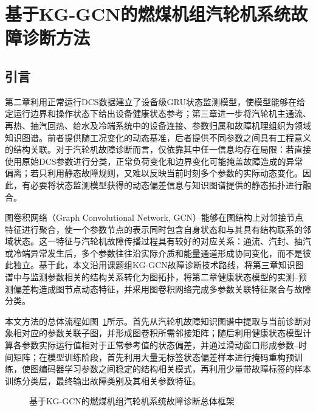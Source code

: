 \section{基于KG-GCN的燃煤机组汽轮机系统故障诊断方法}
\label{sec:kg_gcn_v2}

\subsection{引言}

第二章利用正常运行DCS数据建立了设备级GRU状态监测模型，使模型能够在给定运行边界和操作状态下给出设备健康状态参考；第三章进一步将汽轮机主通流、再热、抽汽回热、给水及冷端系统中的设备连接、参数归属和故障机理组织为领域知识图谱。前者提供随工况变化的动态基准，后者提供不同参数之间具有工程意义的结构关联。对于汽轮机故障诊断而言，仅依靠其中任一信息均存在局限：若直接使用原始DCS参数进行分类，正常负荷变化和边界变化可能掩盖故障造成的异常偏离；若只利用静态故障规则，又难以反映当前时刻多个参数的实际动态变化。因此，有必要将状态监测模型获得的动态偏差信息与知识图谱提供的静态拓扑进行融合。

图卷积网络（Graph Convolutional Network, GCN）能够在图结构上对邻接节点特征进行聚合，使一个参数节点的表示同时包含自身状态和与其具有结构联系的邻域状态\cite{Kipf2017GCN}。这一特征与汽轮机故障传播过程具有较好的对应关系：通流、汽封、抽汽或冷端异常发生后，多个参数往往沿实际介质和能量通道形成协同变化，而不是彼此独立。基于此，本文沿用课题组KG-GCN故障诊断技术路线\cite{YangHaodong2026CFB}，将第三章知识图谱中与监测参数相关的结构关系转化为图拓扑，将第二章健康状态模型的实测--预测偏差构造成图节点动态特征，并采用图卷积网络完成多参数关联特征聚合与故障分类。

本文方法的总体流程如图~\ref{fig:kg_gcn_overall_v2}所示。首先从汽轮机故障知识图谱中提取与当前诊断对象相对应的参数关联子图，并形成图卷积所需邻接矩阵；随后利用健康状态模型计算各参数实际运行值相对于正常参考值的状态偏差，并通过滑动窗口形成参数--时间矩阵；在模型训练阶段，首先利用大量无标签状态偏差样本进行掩码重构预训练，使图编码器学习参数之间稳定的结构相关模式，再利用少量带故障标签的样本训练分类层，最终输出故障类别及其相关参数特征。

\begin{figure}[htbp]
    \centering
    \caption{基于KG-GCN的燃煤机组汽轮机系统故障诊断总体框架}
    \label{fig:kg_gcn_overall_v2}
\end{figure}


